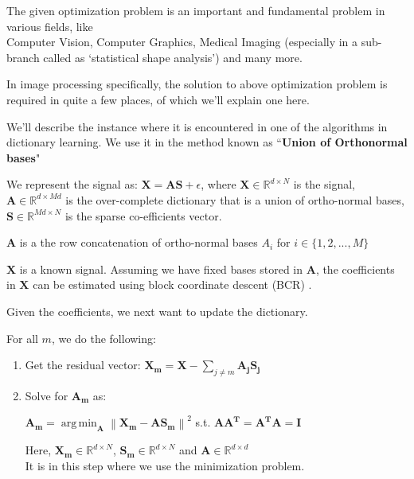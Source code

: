\documentclass[fleqn, 11pt]{article}
\DeclareMathOperator*{\argmin}{arg\,min}
\newcommand{\bs}[1]{\boldsymbol{#1}}
\newcommand\norm[1]{\left\lVert#1\right\rVert}
\newcommand{\R}[0]{\mathbb{R}}
\begin{document}
The given optimization problem is an important and fundamental problem in various fields, like   \\ 
Computer Vision, Computer Graphics, Medical Imaging (especially in a sub-branch called as `statistical shape analysis') and many more.

\medskip

In image processing specifically, the solution to above optimization problem is required in quite a few places, of which we'll explain one here. 

\medskip 

We'll describe the instance where it is encountered in one of the algorithms in dictionary learning. We use it in the method known as ``\textbf{Union of Orthonormal bases}"

\smallskip

We represent the signal as: $\bs{X}=\bs{AS}+\epsilon$, where $\bs{X} \in \R^{d \times N}$ is the signal, 
$\bs{A} \in \R^{d \times Md} $ is the over-complete dictionary that is a union of ortho-normal
bases,  $\bs{S} \in \R^{Md \times N} $ is 
the sparse co-efficients vector. 

\smallskip

$\bs{A}$ is a the row concatenation of ortho-normal bases $A_i$ for $i \in \{ 1,2,...,M \}$

\smallskip

$\bs{X}$ is a known signal. Assuming we have fixed bases stored in $\bs{A}$, the
coefficients in $\bs{X}$ can be estimated using block
coordinate descent (BCR) . 

\smallskip

Given the coefficients, we next want to update
the dictionary. 

\medskip

For all $m$, we do the following: 
\begin{enumerate}
    \item Get the residual vector: $\bs{ X_m = X} - \displaystyle  \sum_{j \neq m} \bs{A_j S_j }$
    \item Solve for $\bs{A_m}$ as: 
    \begin{center}
            $\bs{A_m} = \argmin_{\bs{A}} \norm{\bs{X_m-AS_m}}^2$ s.t. $\bs{AA^T=A^TA=I}$
    \end{center}
    Here, $\bs{X_m} \in \R^{d \times N}$, $\bs{S_m} \in \R^{d \times N} $ and  $\bs{A} \in \R^{d \times d} $ \\
    It is in this step where we use the minimization problem. 
\end{enumerate}
\end{document}
